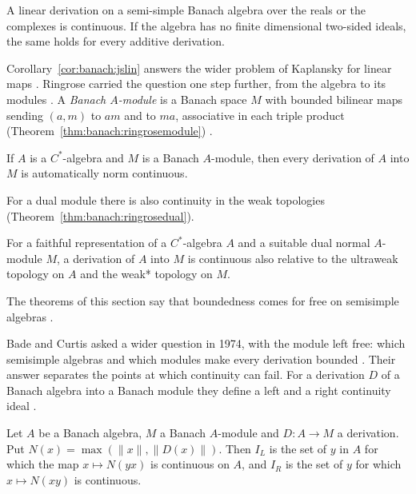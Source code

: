 \begin{corollary}\label{cor:banach:jslin}
A linear derivation on a semi-simple Banach algebra over the reals or the
complexes is continuous. If the algebra has no finite dimensional
two-sided ideals, the same holds for every additive derivation.
\end{corollary}

Corollary~\ref{cor:banach:jslin} answers the wider problem of Kaplansky for
linear maps \cite[p.~1067]{JohnsonSinclair1968}. Ringrose carried the
question one step further, from the algebra to its modules
\cite[p.~432]{Ringrose1972Automatic}. A \emph{Banach $A$-module} is a
Banach space $M$ with bounded bilinear maps sending $(a,m)$ to $am$ and
to $ma$, associative in each triple product (Theorem~\ref{thm:banach:ringrosemodule})
\cite[p.~432]{Ringrose1972Automatic}.\begin{theorem}\label{thm:banach:ringrosemodule}
If $A$ is a $C^*$-algebra and $M$ is a Banach $A$-module, then every
derivation of $A$ into $M$ is automatically norm continuous.
\end{theorem}

For a dual module there is also continuity in the weak topologies
(Theorem~\ref{thm:banach:ringrosedual}).

\begin{theorem}\label{thm:banach:ringrosedual}
For a faithful representation of a $C^*$-algebra $A$ and a suitable dual
normal $A$-module $M$, a derivation of $A$ into $M$ is continuous also
relative to the ultraweak topology on $A$ and the weak* topology on $M$.
\end{theorem}

The theorems of this section say that boundedness comes for free on
semisimple algebras \cite[Remark~4.3, p.~1072]{JohnsonSinclair1968}.

Bade and Curtis asked a wider question in 1974, with the module left free:
which semisimple algebras and which modules make every derivation
bounded \cite[p.~373]{BadeCurtis1974}. Their answer separates the points at
which continuity can fail. For a derivation $D$ of a Banach algebra into a
Banach module they define a left and a right continuity ideal
\cite[Definition~2.1, p.~374]{BadeCurtis1974}.

\begin{definition}\label{def:banach:continuity-ideal}
Let $A$ be a Banach algebra, $M$ a Banach $A$-module and $D\colon A\to M$ a
derivation. Put $N(x)=\max(\|x\|,\|D(x)\|)$. Then $I_L$ is the set of $y$ in
$A$ for which the map $x\mapsto N(yx)$ is continuous on $A$, and $I_R$ is the
set of $y$ for which $x\mapsto N(xy)$ is continuous.
\end{definition}

